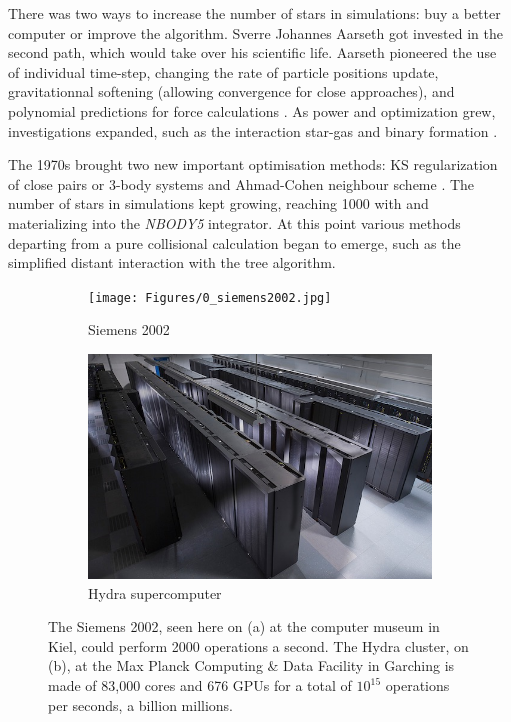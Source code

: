 There was two ways to increase the number of stars in simulations: buy a better computer or improve the algorithm. Sverre Johannes Aarseth got invested in the second path, which would take over his scientific life. Aarseth pioneered the use of individual time-step, changing the rate of particle positions update, gravitationnal softening (allowing convergence for close approaches), and polynomial predictions for force calculations \citep{Aarseth1964}. As power and optimization grew, investigations expanded, such as the interaction star-gas \citep{VanAlbada1968a} and binary formation \citep{VanAlbada1968b}.

The 1970s brought two new important optimisation methods: KS regularization of close pairs \citep{Aarseth1972} or 3-body systems \citep{Aarseth1974b} and Ahmad-Cohen neighbour scheme \citep{AhmadCohen1973}. The number of stars in simulations kept growing, reaching 1000 with \cite{Terlevich1980} and materializing into the \textit{NBODY5} integrator. At this point various methods departing from a pure collisional calculation began to emerge, such as the simplified distant interaction with the \cite{BarnesHut1986} tree algorithm.


\begin{figure}
\center
    \centering
    \begin{subfigure}[b]{0.45\textwidth}
    	\centering
    	\texttt{[image: Figures/0\_siemens2002.jpg]}
        \caption{Siemens 2002}
        \label{Fig:0_siemens}
    \end{subfigure}
    \begin{subfigure}[b]{0.45\textwidth}
    	\centering
    	\includegraphics[width=\linewidth]{Figures/0_hydra.png}
        \caption{Hydra supercomputer}
        \label{Fig:0_hydra}
    \end{subfigure}
\caption{The Siemens 2002, seen here on (a) at the computer museum in Kiel, could perform 2000 operations a second. The Hydra cluster, on (b), at the Max Planck Computing \& Data Facility in Garching is made of 83,000 cores and 676 GPUs for a total of $10^{15}$ operations per seconds, a billion millions. }
\label{Fig:0_computers}
\end{figure}

